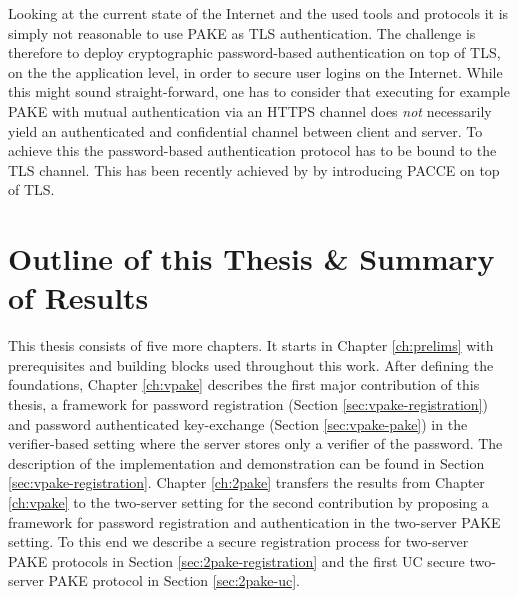 Looking at the current state of the Internet and the used tools and protocols it is simply not reasonable to use \ac{PAKE} as \ac{TLS} authentication.
The challenge is therefore to deploy cryptographic password-based authentication on top of \ac{TLS}, \ie on the the application level, in order to secure user logins on the Internet.
While this might sound straight-forward, one has to consider that executing for example \ac{PAKE} with mutual authentication via an \ac{HTTPS} channel does \emph{not} necessarily yield an authenticated and confidential channel between client and server.
To achieve this the password-based authentication protocol has to be bound to the \ac{TLS} channel.
This has been recently achieved by \citet{MSD13} by introducing \ac{PACCE} on top of \ac{TLS}.


\section{Outline of this Thesis \& Summary of Results}
This thesis consists of five more chapters.
It starts in Chapter \ref{ch:prelims} with prerequisites and building blocks used throughout this work.
After defining the foundations, Chapter \ref{ch:vpake} describes the first major contribution of this thesis, a framework for password registration (Section \ref{sec:vpake-registration}) and password authenticated key-exchange (Section \ref{sec:vpake-pake}) in the verifier-based setting where the server stores only a verifier of the password.
The description of the implementation and demonstration can be found in Section \ref{sec:vpake-registration}.
Chapter \ref{ch:2pake} transfers the results from Chapter \ref{ch:vpake} to the two-server setting for the second contribution by proposing a framework for password registration and authentication in the two-server \ac{PAKE} setting.
To this end we describe a secure registration process for two-server \ac{PAKE} protocols in Section \ref{sec:2pake-registration} and the first \ac{UC} secure two-server \ac{PAKE} protocol in Section \ref{sec:2pake-uc}.




